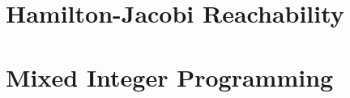 \section{Hamilton-Jacobi Reachability \label{sec:HJI}}
\section{Mixed Integer Programming \label{sec:MIP}}